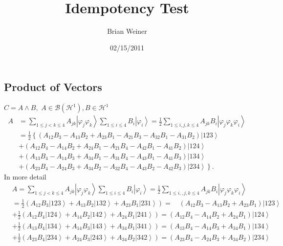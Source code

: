 \documentclass[aps,preprint]{revtex4}%
\begin{document}
\preprint{ }
\title{Idempotency Test}
\author{Brian Weiner}
\date{02/15/2011}
\maketitle
\tableofcontents


\subsection{Product of Vectors}

$C=A\wedge B,$ $A\in\mathcal{B}\left(  \mathcal{H}^{1}\right)  ,B\in
\mathcal{H}^{1}$%
\begin{align}
A  &  =\sum_{1\leq j<k\leq4}A_{jk}\left\vert \varphi_{j}\varphi_{k}%
\right\rangle \sum_{1\leq i\leq4}B_{i}\left\vert \varphi_{i}\right\rangle
=\frac{1}{2}\sum_{1\leq i,j,k\leq4}A_{jk}B_{i}\left\vert \varphi_{j}%
\varphi_{k}\varphi_{i}\right\rangle \nonumber\\
&  =\frac{1}{2}\left\{  \left(  A_{12}B_{3}-A_{13}B_{2}+A_{23}B_{1}%
-A_{21}B_{3}-A_{32}B_{1}-A_{31}B_{2}\right)  \left\vert 123\right\rangle
\right. \nonumber\\
&  +\left(  A_{12}B_{4}-A_{14}B_{2}+A_{24}B_{1}-A_{21}B_{4}-A_{42}B_{1}%
-A_{41}B_{2}\right)  \left\vert 124\right\rangle \nonumber\\
&  +\left(  A_{13}B_{4}-A_{14}B_{3}+A_{34}B_{1}-A_{31}B_{4}-A_{43}B_{1}%
-A_{41}B_{3}\right)  \left\vert 134\right\rangle \nonumber\\
&  \left.  +\left(  A_{23}B_{4}-A_{24}B_{3}+A_{34}B_{2}-A_{32}B_{4}%
-A_{43}B_{2}-A_{42}B_{3}\right)  \left\vert 234\right\rangle \right\}  .
\end{align}
In more detail%
\begin{align}
&  A=\sum_{1\leq j<k\leq4}A_{jk}\left\vert \varphi_{j}\varphi_{k}\right\rangle
\sum_{1\leq i\leq4}B_{i}\left\vert \varphi_{i}\right\rangle =\frac{1}{2}%
\sum_{1\leq i,,j,k\leq4}A_{jk}B_{i}\left\vert \varphi_{j}\varphi_{k}%
\varphi_{i}\right\rangle \nonumber\\
&  =\frac{1}{2}\left(  A_{12}B_{3}\left\vert 123\right\rangle +A_{13}%
B_{2}\left\vert 132\right\rangle +A_{23}B_{1}\left\vert 231\right\rangle
\right)  =\quad\left(  A_{12}B_{3}-A_{13}B_{2}+A_{23}B_{1}\right)  \left\vert
123\right\rangle \nonumber\\
&  \left.  +\right.  \frac{1}{2}\left(  A_{12}B_{4}\left\vert 124\right\rangle
+A_{14}B_{2}\left\vert 142\right\rangle +A_{24}B_{1}\left\vert
241\right\rangle \right)  =\left(  A_{12}B_{4}-A_{14}B_{2}+A_{24}B_{1}\right)
\left\vert 124\right\rangle \nonumber\\
&  \left.  +\right.  \frac{1}{2}\left(  A_{13}B_{4}\left\vert 134\right\rangle
+A_{14}B_{3}\left\vert 143\right\rangle +A_{34}B_{1}\left\vert
341\right\rangle \right)  =\left(  A_{13}B_{4}-A_{14}B_{3}+A_{34}B_{1}\right)
\left\vert 134\right\rangle \nonumber\\
&  \left.  +\right.  \frac{1}{2}\left(  A_{23}B_{4}\left\vert 234\right\rangle
+A_{24}B_{3}\left\vert 243\right\rangle +A_{34}B_{2}\left\vert
342\right\rangle \right)  =\left(  A_{23}B_{4}-A_{24}B_{3}+A_{34}B_{2}\right)
\left\vert 234\right\rangle
\end{align}
\end{document}

